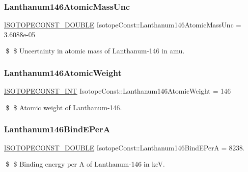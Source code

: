 \subsubsection{\texorpdfstring{Lanthanum146\+Atomic\+Mass\+Unc}{Lanthanum146AtomicMassUnc}}
{\footnotesize\ttfamily \mbox{\hyperlink{group___isotope_const-_macros_ga8f45a7272ce02c0b4c65c44636ed719a}{I\+S\+O\+T\+O\+P\+E\+C\+O\+N\+S\+T\+\_\+\+D\+O\+U\+B\+LE}} Isotope\+Const\+::\+Lanthanum146\+Atomic\+Mass\+Unc = 3.\+6088e-\/05}

\$ \$ Uncertainty in atomic mass of Lanthanum-\/146 in amu. \mbox{\label{group___isotope_const-_lanthanum-_la146_gae3ae47e754429eeb6ef2e8241e021301}} 
\subsubsection{\texorpdfstring{Lanthanum146\+Atomic\+Weight}{Lanthanum146AtomicWeight}}
{\footnotesize\ttfamily \mbox{\hyperlink{group___isotope_const-_macros_ga5f18360b3e99483a35c32d789e62621c}{I\+S\+O\+T\+O\+P\+E\+C\+O\+N\+S\+T\+\_\+\+I\+NT}} Isotope\+Const\+::\+Lanthanum146\+Atomic\+Weight = 146}

\$ \$ Atomic weight of Lanthanum-\/146. \mbox{\label{group___isotope_const-_lanthanum-_la146_ga3f4e1df1776fe86d438d62942350c527}} 
\subsubsection{\texorpdfstring{Lanthanum146\+Bind\+E\+PerA}{Lanthanum146BindEPerA}}
{\footnotesize\ttfamily \mbox{\hyperlink{group___isotope_const-_macros_ga8f45a7272ce02c0b4c65c44636ed719a}{I\+S\+O\+T\+O\+P\+E\+C\+O\+N\+S\+T\+\_\+\+D\+O\+U\+B\+LE}} Isotope\+Const\+::\+Lanthanum146\+Bind\+E\+PerA = 8238.}

\$ \$ Binding energy per A of Lanthanum-\/146 in keV. \mbox{\label{group___isotope_const-_lanthanum-_la146_ga2e9bbd1dab6eb0ec16f0d311521679dd}} 
